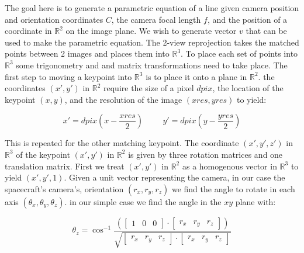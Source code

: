 The goal here is to generate a parametric equation of a line given camera position and orientation coordinates $C$,
the camera focal length $f$, and the position of a coordinate in $\mathbb{R}^{2}$ on the image plane. We wish to
generate vector $v$ that can be used to make the parametric equation.
The 2-view reprojection takes the matched points between 2 images and places them into $\mathbb{R}^{3}$.
To place each set of points into $\mathbb{R}^{3}$ some trigonometry and and matrix transformations need to take place.
The first step to moving a keypoint into $\mathbb{R}^{3}$ is to place it onto a plane in $\mathbb{R}^{2}$.
the coordinates $(x', y')$ in $\mathbb{R}^{2}$ require the size of a pixel $dpix$, the location of the keypoint $(x, y)$,
and the resolution of the image $(xres, yres)$ to yield:

\[
x' = dpix(x - \frac{xres}{2})\hspace{1cm} y' = dpix(y - \frac{yres}{2})
\label{test}
\]

This is repeated for the other matching keypoint. The coordinate $(x', y', z')$ in $\mathbb{R}^{3}$ of
the keypoint $(x', y')$ in $\mathbb{R}^{2}$ is given by three rotation matrices and one translation matrix.
First we treat $(x', y')$ in $\mathbb{R}^{2}$ as a homogenous vector in $\mathbb{R}^{3}$ to yield $(x', y', 1)$.
Given a unit vector representing the camera, in our case the spacecraft’s
camera’s, orientation $(r_x,r_y,r_z)$ we find the angle to rotate in each axis $(\theta_x,\theta_y,\theta_z)$.
in our simple case we find the angle in the $xy$ plane with:

\[
\theta_z = \cos^{-1} \frac{ (\begin{bmatrix}1 & 0 & 0\end{bmatrix} \cdot \begin{bmatrix}r_x & r_y & r_z \end{bmatrix}) }{ \sqrt{ \begin{bmatrix}r_x & r_y & r_z\end{bmatrix} \cdot \begin{bmatrix}r_x & r_y & r_z\end{bmatrix} } }
\]


